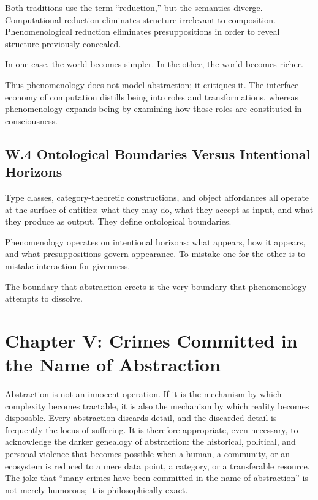 \documentclass[11pt,letterpaper]{article}
\begin{document}
Both traditions use the term ``reduction,'' but the semantics diverge. Computational reduction eliminates structure irrelevant to composition. Phenomenological reduction eliminates presuppositions in order to reveal structure previously concealed.

In one case, the world becomes simpler.  
In the other, the world becomes richer.

Thus phenomenology does not model abstraction; it critiques it. The interface economy of computation distills being into roles and transformations, whereas phenomenology expands being by examining how those roles are constituted in consciousness.

\subsection{W.4 Ontological Boundaries Versus Intentional Horizons}

Type classes, category-theoretic constructions, and object affordances all operate at the surface of entities: what they may do, what they accept as input, and what they produce as output. They define ontological boundaries.

Phenomenology operates on intentional horizons: what appears, how it appears, and what presuppositions govern appearance. To mistake one for the other is to mistake interaction for givenness.

The boundary that abstraction erects is the very boundary that phenomenology attempts to dissolve.

\newpage

\section{Chapter V: Crimes Committed in the Name of Abstraction}

Abstraction is not an innocent operation. If it is the mechanism by which complexity becomes tractable, it is also the mechanism by which reality becomes disposable. Every abstraction discards detail, and the discarded detail is frequently the locus of suffering. It is therefore appropriate, even necessary, to acknowledge the darker genealogy of abstraction: the historical, political, and personal violence that becomes possible when a human, a community, or an ecosystem is reduced to a mere data point, a category, or a transferable resource. The joke that ``many crimes have been committed in the name of abstraction'' is not merely humorous; it is philosophically exact.
\end{document}
